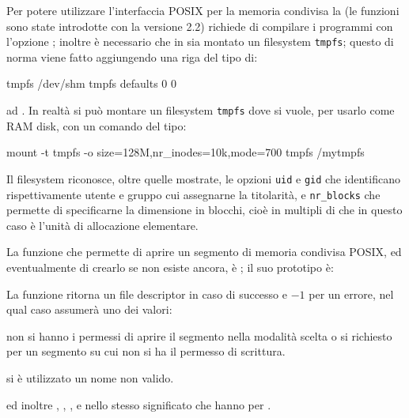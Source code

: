 Per potere utilizzare l'interfaccia POSIX per la memoria condivisa la
 (le funzioni sono state introdotte con la versione 2.2) richiede
di compilare i programmi con l'opzione ; inoltre è necessario che
in  sia montato un filesystem \texttt{tmpfs}; questo di norma
viene fatto aggiungendo una riga del tipo di:
\begin{FileExample}[label=/etc/fstab]
tmpfs   /dev/shm        tmpfs   defaults        0      0
\end{FileExample}
ad . In realtà si può montare un filesystem
\texttt{tmpfs} dove si vuole, per usarlo come RAM disk, con un comando del
tipo:
\begin{Example}
mount -t tmpfs -o size=128M,nr_inodes=10k,mode=700 tmpfs /mytmpfs
\end{Example}

Il filesystem riconosce, oltre quelle mostrate, le opzioni \texttt{uid} e
\texttt{gid} che identificano rispettivamente utente e gruppo cui assegnarne
la titolarità, e \texttt{nr\_blocks} che permette di specificarne la
dimensione in blocchi, cioè in multipli di  che in
questo caso è l'unità di allocazione elementare.

La funzione che permette di aprire un segmento di memoria condivisa POSIX, ed
eventualmente di crearlo se non esiste ancora, è ; il suo
prototipo è:

\begin{funcproto}{

}

{La funzione ritorna un file descriptor in caso di successo e $-1$ per un
  errore, nel qual caso  assumerà uno dei valori:
  \begin{errlist}
  \item[\errcode{EACCES}] non si hanno i permessi di aprire il segmento nella
    modalità scelta o si richiesto  per un segmento su cui non
    si ha il permesso di scrittura.
  \item[\errcode{EINVAL}] si è utilizzato un nome non valido.
  \end{errlist}
  ed inoltre , , ,
   e  nello stesso significato che hanno per
  .
}  
\end{funcproto}


